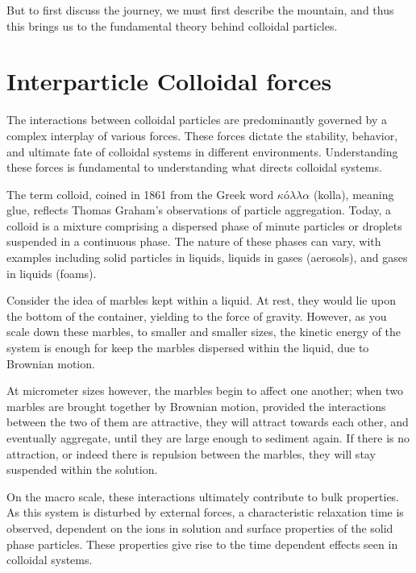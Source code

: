 But to first discuss the journey, we must first describe the mountain, and thus this brings us to the fundamental theory behind colloidal particles.

\section{Interparticle Colloidal forces}

The interactions between colloidal particles are predominantly governed by a complex interplay of various forces. These forces dictate the stability, behavior, and ultimate fate of colloidal systems in different environments. Understanding these forces is fundamental to understanding what directs colloidal systems.

The term colloid, coined in 1861 from the Greek word $κόλλα$ (kolla), meaning glue, reflects Thomas Graham's observations of particle aggregation\cite{old_colloid}. Today, a colloid is a mixture comprising a dispersed phase of minute particles or droplets suspended in a continuous phase. The nature of these phases can vary, with examples including solid particles in liquids, liquids in gases (aerosols), and gases in liquids (foams). 

Consider the idea of marbles kept within a liquid. At rest, they would lie upon the bottom of the container, yielding to the force of gravity\cite{newton1687principia}. However, as you scale down these marbles, to smaller and smaller sizes, the kinetic energy of the system is enough for keep the marbles dispersed within the liquid, due to Brownian motion\cite{brown1827brief}.

At micrometer sizes however, the marbles begin to affect one another; when two marbles are brought together by Brownian motion, provided the interactions between the two of them are attractive, they will attract towards each other, and eventually aggregate, until they are large enough to sediment again. If there is no attraction, or indeed there is repulsion between the marbles, they will stay suspended within the solution.


On the macro scale, these interactions ultimately contribute to bulk properties. As this system is disturbed by external forces, a characteristic relaxation time is observed, dependent on the ions in solution and surface properties of the solid phase particles. 
These properties give rise to the time dependent effects seen in colloidal systems. 

